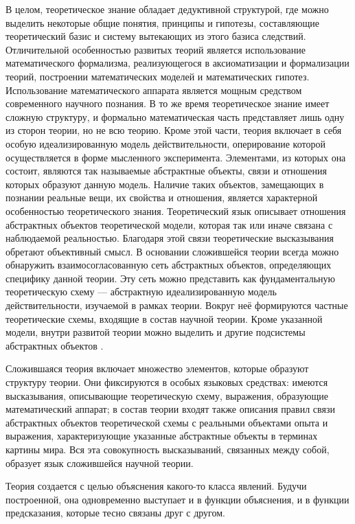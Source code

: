 В целом, теоретическое знание обладает дедуктивной структурой, где можно выделить некоторые общие понятия, принципы и гипотезы, составляющие теоретический базис и систему вытекающих из этого базиса следствий. Отличительной особенностью развитых теорий является использование математического формализма, реализующегося в аксиоматизации и формализации теорий, построении математических моделей и математических гипотез. Использование математического аппарата является мощным средством современного научного познания. В то же время теоретическое знание имеет сложную структуру, и формально математическая часть представляет лишь одну из сторон теории, но не всю теорию. Кроме этой части, теория включает в себя особую идеализированную модель действительности, оперирование которой осуществляется в форме мысленного эксперимента. Элементами, из которых она состоит, являются так называемые абстрактные объекты, связи и отношения которых образуют данную модель. Наличие таких объектов, замещающих в познании реальные вещи, их свойства и отношения, является характерной особенностью теоретического знания. Теоретический язык описывает отношения абстрактных объектов теоретической модели, которая так или иначе связана с наблюдаемой реальностью. Благодаря этой связи теоретические высказывания обретают объективный смысл. В основании сложившейся теории всегда можно обнаружить взаимосогласованную сеть абстрактных объектов, определяющих специфику данной теории. Эту сеть можно представить как фундаментальную теоретическую схему — абстрактную идеализированную модель действительности, изучаемой в рамках теории. Вокруг неё формируются частные теоретические схемы, входящие в состав научной теории. Кроме указанной модели, внутри развитой теории можно выделить и другие подсистемы абстрактных объектов \cite{gtm:methods}.

Сложившаяся теория включает множество элементов, которые образуют структуру теории. Они фиксируются в особых языковых средствах: имеются высказывания, описывающие теоретическую схему, выражения, образующие математический аппарат; в состав теории входят также описания правил связи абстрактных объектов теоретической схемы с реальными объектами опыта и выражения, характеризующие указанные абстрактные объекты в терминах картины мира. Вся эта совокупность высказываний, связанных между собой, образует язык сложившейся научной теории.

Теория создается с целью объяснения какого-то класса явлений. Будучи построенной, она одновременно выступает и в функции объяснения, и в функции предсказания, которые тесно связаны друг с другом.

